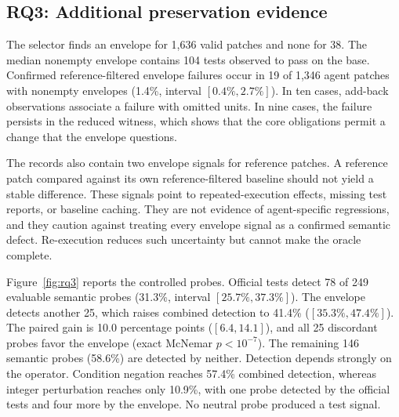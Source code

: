 \documentclass[a4paper,fleqn]{cas-sc}
\begin{document}
\subsection{RQ3: Additional preservation evidence}\label{sec:rq3}

The selector finds an envelope for 1,636 valid patches and none for 38. The median nonempty envelope contains 104 tests observed to pass on the base. Confirmed reference-filtered envelope failures occur in 19 of 1,346 agent patches with nonempty envelopes (1.4\%, interval $[0.4\%, 2.7\%]$). In ten cases, add-back observations associate a failure with omitted units. In nine cases, the failure persists in the reduced witness, which shows that the core obligations permit a change that the envelope questions.

The records also contain two envelope signals for reference patches. A reference patch compared against its own reference-filtered baseline should not yield a stable difference. These signals point to repeated-execution effects, missing test reports, or baseline caching. They are not evidence of agent-specific regressions, and they caution against treating every envelope signal as a confirmed semantic defect. Re-execution reduces such uncertainty but cannot make the oracle complete.

Figure~\ref{fig:rq3} reports the controlled probes. Official tests detect 78 of 249 evaluable semantic probes (31.3\%, interval $[25.7\%, 37.3\%]$). The envelope detects another 25, which raises combined detection to 41.4\% ($[35.3\%, 47.4\%]$). The paired gain is 10.0 percentage points ($[6.4, 14.1]$), and all 25 discordant probes favor the envelope (exact McNemar $p<10^{-7}$). The remaining 146 semantic probes (58.6\%) are detected by neither. Detection depends strongly on the operator. Condition negation reaches 57.4\% combined detection, whereas integer perturbation reaches only 10.9\%, with one probe detected by the official tests and four more by the envelope. No neutral probe produced a test signal.
\end{document}
